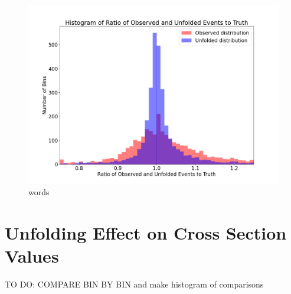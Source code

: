     
    \begin{figure}[ht]
    \centering
    \includegraphics[trim={0 0 0 0},clip,width=\textwidth]{Chapters/Ch5-Further/0_IBU/pics/complete/histogram_of_ratio_of_observed_and_unfolded_events_to_truth.png}
    \caption[words]{words}
    \label{fig:ibu1}
    \end{figure}
    
\clearpage

\section{Unfolding Effect on Cross Section Values}

 TO DO: COMPARE BIN BY BIN and make histogram of comparisons